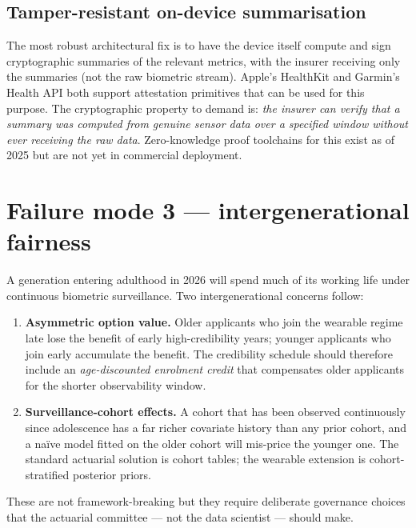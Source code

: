 \subsection{Tamper-resistant on-device summarisation}\label{ss:tamper}

The most robust architectural fix is to have the device itself
compute and sign cryptographic summaries of the relevant metrics,
with the insurer receiving only the summaries (not the raw
biometric stream). Apple's HealthKit and Garmin's Health API both
support attestation primitives that can be used for this purpose.
The cryptographic property to demand is: \emph{the insurer can
verify that a summary was computed from genuine sensor data over a
specified window without ever receiving the raw data}. Zero-knowledge
proof toolchains for this exist as of 2025 \citep{ZKHealth2024} but
are not yet in commercial deployment.

\section{Failure mode 3 --- intergenerational fairness}\label{sec:fairness}

A generation entering adulthood in 2026 will spend much of its
working life under continuous biometric surveillance. Two
intergenerational concerns follow:

\begin{enumerate}[leftmargin=*,nosep,topsep=4pt]
   \item \textbf{Asymmetric option value.} Older applicants who
         join the wearable regime late lose the benefit of early
         high-credibility years; younger applicants who join early
         accumulate the benefit. The credibility schedule should
         therefore include an \emph{age-discounted enrolment
         credit} that compensates older applicants for the
         shorter observability window.
   \item \textbf{Surveillance-cohort effects.} A cohort that has
         been observed continuously since adolescence has a far
         richer covariate history than any prior cohort, and a
         na\"ive model fitted on the older cohort will mis-price the
         younger one. The standard actuarial solution is cohort
         tables; the wearable extension is cohort-stratified
         posterior priors.
\end{enumerate}

These are not framework-breaking but they require deliberate
governance choices that the actuarial committee --- not the data
scientist --- should make.

